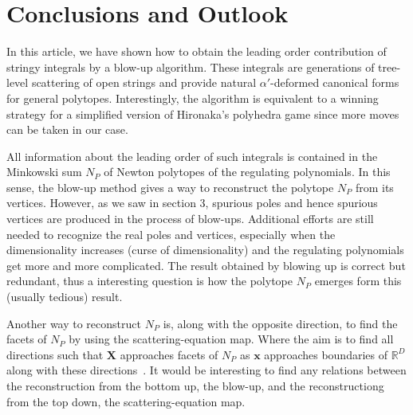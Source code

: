 \documentclass[12pt]{article}
\theoremstyle{definition}
\newtheorem{defi}[para]{Definition}
\theoremstyle{plain}
\begin{document}
% 
% 



\section{Conclusions and Outlook}


In this article, we have shown how to obtain the leading order contribution of stringy integrals by a blow-up algorithm. These integrals are generations of tree-level scattering of open strings and provide natural $\alpha'$-deformed canonical forms for general polytopes. Interestingly, the algorithm is equivalent to a winning strategy for a simplified version of Hironaka's polyhedra game since more moves can be taken in our case.

All information about the leading order of such integrals is contained in the Minkowski sum $N_{P}$ of Newton polytopes of the regulating polynomials. In this sense, the blow-up method gives a way to reconstruct the polytope $N_{P}$ from its vertices. However, as we saw in section 3, spurious poles and hence spurious vertices are produced in the process of blow-ups. Additional efforts are still needed to recognize the real poles and vertices, especially when the dimensionality increases (curse of dimensionality) and the regulating polynomials get more and more complicated. The result obtained by blowing up is correct but redundant, thus a interesting question is how the polytope $N_{P}$ emerges form this (usually tedious) result. 


Another way to reconstruct $N_{P}$ is, along with the opposite direction, to find the facets of $N_{P}$ by using the scattering-equation map. Where the aim is to find all directions such that $\mathbf{X}$ approaches facets of $N_{P}$ as $\mathbf{x}$ approaches boundaries of $\mathbb{R}^{D}$ along with these directions~\cite{He:2020ray}. It would be interesting to find any relations between the reconstruction from the bottom up, the blow-up, and the reconstructiong from the top down, the scattering-equation map.
\end{document}
